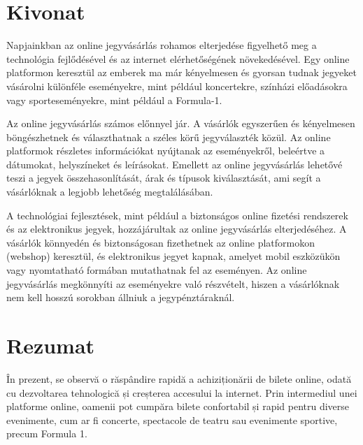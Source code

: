 
\hungarianParagraph


\chapter*{Kivonat}

Napjainkban az online jegyvásárlás rohamos elterjedése figyelhető meg a technológia fejlődésével és az internet elérhetőségének növekedésével. Egy online platformon keresztül az emberek ma már kényelmesen és gyorsan tudnak jegyeket vásárolni különféle eseményekre, mint például koncertekre, színházi előadásokra vagy sporteseményekre, mint például a Formula-1.

Az online jegyvásárlás számos előnnyel jár. A vásárlók egyszerűen és kényelmesen böngészhetnek és választhatnak a széles körű jegyválaszték közül. Az online platformok részletes információkat nyújtanak az eseményekről, beleértve a dátumokat, helyszíneket és leírásokat. Emellett az online jegyvásárlás lehetővé teszi a jegyek összehasonlítását, árak és típusok kiválasztását, ami segít a vásárlóknak a legjobb lehetőség megtalálásában.

A technológiai fejlesztések, mint például a biztonságos online fizetési rendszerek és az elektronikus jegyek, hozzájárultak az online jegyvásárlás elterjedéséhez. A vásárlók könnyedén és biztonságosan fizethetnek az online platformokon (webshop) keresztül, és elektronikus jegyet kapnak, amelyet mobil eszközükön vagy nyomtatható formában mutathatnak fel az eseményen. Az online jegyvásárlás megkönnyíti az eseményekre való részvételt, hiszen a vásárlóknak nem kell hosszú sorokban állniuk a jegypénztáraknál. 


\vfill
{}

\chapter*{Rezumat}

În prezent, se observă o răspândire rapidă a achiziționării de bilete online, odată cu dezvoltarea tehnologică și creșterea accesului la internet. Prin intermediul unei platforme online, oamenii pot cumpăra bilete confortabil și rapid pentru diverse evenimente, cum ar fi concerte, spectacole de teatru sau evenimente sportive, precum Formula 1.

